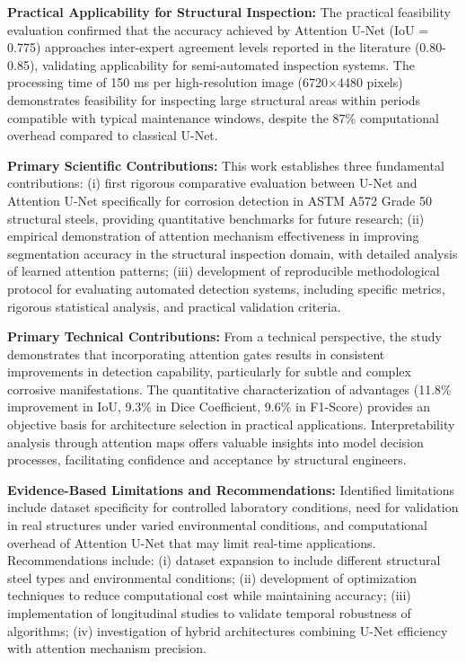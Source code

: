 \documentclass[12pt,a4paper,twoside]{article}
\begin{document}
\textbf{Practical Applicability for Structural Inspection:} The practical feasibility evaluation confirmed that the accuracy achieved by Attention U-Net (IoU = 0.775) approaches inter-expert agreement levels reported in the literature (0.80-0.85), validating applicability for semi-automated inspection systems. The processing time of 150 ms per high-resolution image (6720×4480 pixels) demonstrates feasibility for inspecting large structural areas within periods compatible with typical maintenance windows, despite the 87\% computational overhead compared to classical U-Net.

\textbf{Primary Scientific Contributions:} This work establishes three fundamental contributions: (i) first rigorous comparative evaluation between U-Net and Attention U-Net specifically for corrosion detection in ASTM A572 Grade 50 structural steels, providing quantitative benchmarks for future research; (ii) empirical demonstration of attention mechanism effectiveness in improving segmentation accuracy in the structural inspection domain, with detailed analysis of learned attention patterns; (iii) development of reproducible methodological protocol for evaluating automated detection systems, including specific metrics, rigorous statistical analysis, and practical validation criteria.

\textbf{Primary Technical Contributions:} From a technical perspective, the study demonstrates that incorporating attention gates results in consistent improvements in detection capability, particularly for subtle and complex corrosive manifestations. The quantitative characterization of advantages (11.8\% improvement in IoU, 9.3\% in Dice Coefficient, 9.6\% in F1-Score) provides an objective basis for architecture selection in practical applications. Interpretability analysis through attention maps offers valuable insights into model decision processes, facilitating confidence and acceptance by structural engineers.

\textbf{Evidence-Based Limitations and Recommendations:} Identified limitations include dataset specificity for controlled laboratory conditions, need for validation in real structures under varied environmental conditions, and computational overhead of Attention U-Net that may limit real-time applications. Recommendations include: (i) dataset expansion to include different structural steel types and environmental conditions; (ii) development of optimization techniques to reduce computational cost while maintaining accuracy; (iii) implementation of longitudinal studies to validate temporal robustness of algorithms; (iv) investigation of hybrid architectures combining U-Net efficiency with attention mechanism precision.
\end{document}
